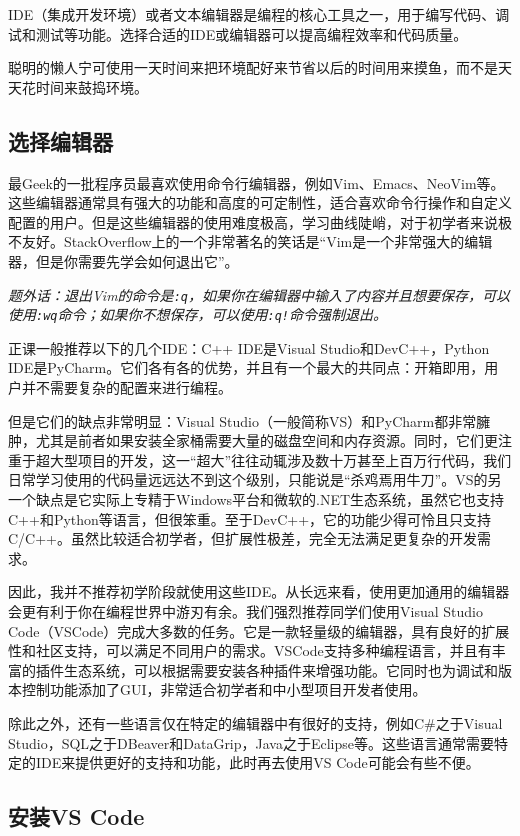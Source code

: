 \documentclass[../main.tex]{subfiles}
\begin{document}
IDE（集成开发环境）或者文本编辑器是编程的核心工具之一，用于编写代码、调试和测试等功能。选择合适的IDE或编辑器可以提高编程效率和代码质量。

聪明的懒人宁可使用一天时间来把环境配好来节省以后的时间用来摸鱼，而不是天天花时间来鼓捣环境。

\subsection{选择编辑器}

最Geek的一批程序员最喜欢使用命令行编辑器，例如Vim、Emacs、NeoVim等。这些编辑器通常具有强大的功能和高度的可定制性，适合喜欢命令行操作和自定义配置的用户。但是这些编辑器的使用难度极高，学习曲线陡峭，对于初学者来说极不友好。StackOverflow上的一个非常著名的笑话是“Vim是一个非常强大的编辑器，但是你需要先学会如何退出它”。

\textit{题外话：退出Vim的命令是\texttt{:q}，如果你在编辑器中输入了内容并且想要保存，可以使用\texttt{:wq}命令；如果你不想保存，可以使用\texttt{:q!}命令强制退出。}

正课一般推荐以下的几个IDE：C++ IDE是Visual Studio和DevC++，Python IDE是PyCharm。它们各有各的优势，并且有一个最大的共同点：开箱即用，用户并不需要复杂的配置来进行编程。

但是它们的缺点非常明显：Visual Studio（一般简称VS）和PyCharm都非常臃肿，尤其是前者如果安装全家桶需要大量的磁盘空间和内存资源。同时，它们更注重于超大型项目的开发，这一“超大”往往动辄涉及数十万甚至上百万行代码，我们日常学习使用的代码量远远达不到这个级别，只能说是“杀鸡焉用牛刀”。VS的另一个缺点是它实际上专精于Windows平台和微软的.NET生态系统，虽然它也支持C++和Python等语言，但很笨重。至于DevC++，它的功能少得可怜且只支持C/C++。虽然比较适合初学者，但扩展性极差，完全无法满足更复杂的开发需求。

因此，我并不推荐初学阶段就使用这些IDE。从长远来看，使用更加通用的编辑器会更有利于你在编程世界中游刃有余。我们强烈推荐同学们使用Visual Studio Code（VSCode）完成大多数的任务。它是一款轻量级的编辑器，具有良好的扩展性和社区支持，可以满足不同用户的需求。VSCode支持多种编程语言，并且有丰富的插件生态系统，可以根据需要安装各种插件来增强功能。它同时也为调试和版本控制功能添加了GUI，非常适合初学者和中小型项目开发者使用。

除此之外，还有一些语言仅在特定的编辑器中有很好的支持，例如C\#之于Visual Studio，SQL之于DBeaver和DataGrip，Java之于Eclipse等。这些语言通常需要特定的IDE来提供更好的支持和功能，此时再去使用VS Code可能会有些不便。

\subsection{安装VS Code}
\end{document}
